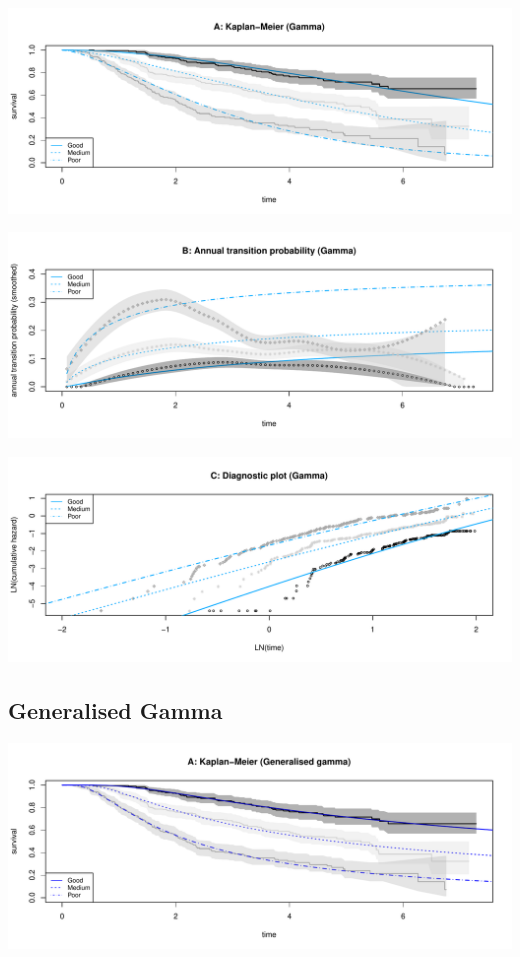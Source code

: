 \documentclass[]{article}
\begin{document}
\begin{flushleft}\includegraphics[height=0.25\textheight]{Images/gam-1} \end{flushleft}

\begin{flushleft}\includegraphics[height=0.25\textheight]{Images/gam-2} \end{flushleft}

\begin{flushleft}\includegraphics[height=0.25\textheight]{Images/gam-3} \end{flushleft}

\newpage 

\subsection{Generalised Gamma}\label{generalised-gamma}

\begin{flushleft}\includegraphics[height=0.25\textheight]{Images/ggam-1} \end{flushleft}
\end{document}
